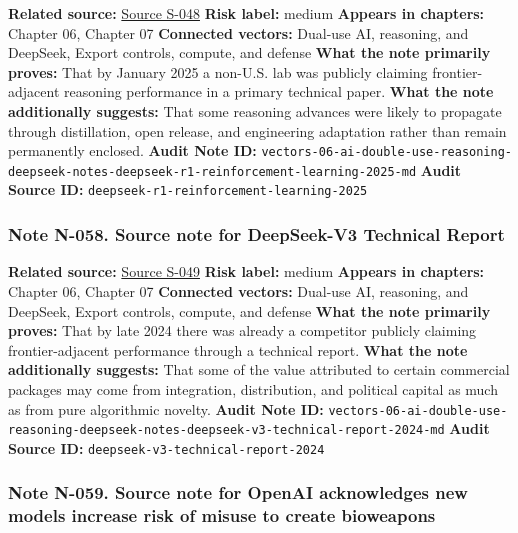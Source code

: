 \documentclass[
  american,
  11pt,
  letterpaper,
]{article}
\begin{document}
\textbf{Related source:}
\hyperref[source-s-048-deepseek-r1-incentivizing-reasoning-capability-in-llms-via-reinforcement-learning]{Source
S-048} \textbf{Risk label:} medium \textbf{Appears in chapters:} Chapter
06, Chapter 07 \textbf{Connected vectors:} Dual-use AI, reasoning, and
DeepSeek, Export controls, compute, and defense \textbf{What the note
primarily proves:} That by January 2025 a non-U.S. lab was publicly
claiming frontier-adjacent reasoning performance in a primary technical
paper. \textbf{What the note additionally suggests:} That some reasoning
advances were likely to propagate through distillation, open release,
and engineering adaptation rather than remain permanently enclosed.
\textbf{Audit Note ID:}
\texttt{vectors-06-ai-double-use-reasoning-deepseek-notes-deepseek-r1-reinforcement-learning-2025-md}
\textbf{Audit Source ID:}
\texttt{deepseek-r1-reinforcement-learning-2025}

\subsubsection{Note N-058. Source note for DeepSeek-V3 Technical
Report}\label{note-n-058-vectors-06-ai-double-use-reasoning-deepseek-notes-deepseek-v3-technical-report-2024-md}

\textbf{Related source:}
\hyperref[source-s-049-deepseek-v3-technical-report]{Source S-049}
\textbf{Risk label:} medium \textbf{Appears in chapters:} Chapter 06,
Chapter 07 \textbf{Connected vectors:} Dual-use AI, reasoning, and
DeepSeek, Export controls, compute, and defense \textbf{What the note
primarily proves:} That by late 2024 there was already a competitor
publicly claiming frontier-adjacent performance through a technical
report. \textbf{What the note additionally suggests:} That some of the
value attributed to certain commercial packages may come from
integration, distribution, and political capital as much as from pure
algorithmic novelty. \textbf{Audit Note ID:}
\texttt{vectors-06-ai-double-use-reasoning-deepseek-notes-deepseek-v3-technical-report-2024-md}
\textbf{Audit Source ID:} \texttt{deepseek-v3-technical-report-2024}

\subsubsection{Note N-059. Source note for OpenAI acknowledges new
models increase risk of misuse to create
bioweapons}\label{note-n-059-vectors-06-ai-double-use-reasoning-deepseek-notes-ft-openai-o1-bioweapon-risk-2024-md}
\end{document}
